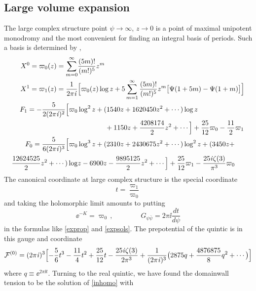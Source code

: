 \subsection{Large volume expansion}

The large complex structure point $\psi\to\infty$, $z\to 0$ is a point
of maximal unipotent monodromy and the most convenient for finding an 
integral basis of periods. Such a basis is determined by \cite{cdgp},
\begin{equation}
\eqlabel{gauge}
\begin{split}
X^0 = \varpi_0 (z) = \sum_{m=0}^\infty &\frac{(5m)!}{(m!)^5} z^m \\
X^1 = \varpi_1 (z) = \frac 1{2\pi\ii  }&\Bigl[\varpi_0(z) \log z + 5 \sum_{m=1}^\infty 
\frac{(5m)!}{(m!)^5} z^m \bigl[\Psi(1+5m)-\Psi(1+m)\bigr]\Bigl] \\
F_1 = -\frac{5}{2(2\pi\ii)^2} \Bigl[\varpi_0& \log^2 z+(1540z+1620450z^2+\cdots)\log z\\
&\qquad\qquad
+1150 z + \frac{4208174}2 z^2+\cdots \Bigr] + \frac{25}{12}\varpi_0 -
\frac{11}{2} \varpi_1  \\
F_0 = \frac{5}{6(2\pi\ii)^3} \Bigl[\varpi_0& \log^3 z+ (2310z+2430675 z^2+\cdots)
\log^2 z
+ (3450z+\\ \frac{12624525}2 z^2+\cdots)\log& z -  6900z-\frac{9895125}2z^2+\cdots
\Bigr] 
+ \frac{25}{12} \varpi_1 - \frac{25\ii\zeta(3)}{\pi^3}\varpi_0  \\
\end{split}
\end{equation}
The canonical coordinate at large complex structure is the special
coordinate 
\begin{equation}
t = \frac{\varpi_1}{\varpi_0}
\end{equation}
and taking the holomorphic limit amounts to putting 
\begin{equation}
\ee^{-K} = \varpi_0\,,  \qquad\qquad
G_{\psi\bar\psi} = 2\pi\ii \frac{dt}{d\psi}
\end{equation}
in the formulas like \eqref{exprop} and \eqref{expsols}. The prepotential of the 
quintic is in this gauge and coordinate
\begin{equation}
{{\cal F}}^{(0)} = (2\pi{\it i})^3 \Bigl[ -\frac 56t^3 -\frac{11}4t^2 + \frac{25}{12}t
-\frac{25{\it i}\zeta(3)}{2\pi^3} + \frac{1}{(2\pi{\it i})^3} \bigl(2875 q + 
\frac{4876875}8 q^2 +\cdots\bigr) \Bigr]
\end{equation}
where $q\equiv \ee^{2\pi\ii t}$. Turning to the real quintic, we have 
found the domainwall tension to be the solution of \eqref{inhomo} with
